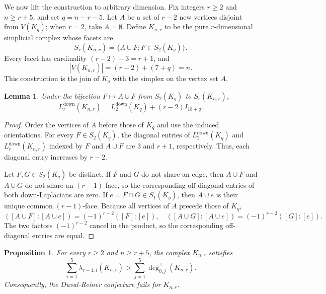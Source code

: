 \documentclass[12pt]{amsart}
\theoremstyle{plain}
\newtheorem{lem}[thm]{Lemma}
\newtheorem{prop}[thm]{Proposition}
\theoremstyle{definition}
\numberwithin{equation}{section}
\numberwithin{figure}{section}
\newcommand{\Ldown}{L^{\operatorname{down}}}
\begin{document}
We now lift the construction to arbitrary dimension.
Fix integers $r\geq 2$ and $n\geq r+5$, and set $q=n-r-5$.
Let $A$ be a set of $r-2$ new vertices disjoint from $V(K_q)$; when $r=2$, take $A=\emptyset$.
Define $K_{n,r}$ to be the pure $r$-dimensional simplicial complex whose facets are
\[
S_r(K_{n,r})
=
\{A\cup F:F\in S_2(K_q)\}.
\]
Every facet has cardinality $(r-2)+3=r+1$, and
\[
|V(K_{n,r})|=(r-2)+(7+q)=n.
\]
This construction is the join of $K_q$ with the simplex on the vertex set $A$.
\begin{lem}\label{complex-core}
Under the bijection $F\mapsto A\cup F$ from $S_2(K_q)$ to $S_r(K_{n,r})$,
\[
\Ldown_r(K_{n,r})
=
\Ldown_2(K_q)+(r-2)I_{18+q}.
\]
\end{lem}
\begin{proof}
Order the vertices of $A$ before those of $K_q$ and use the induced orientations.
For every $F\in S_2(K_q)$, the diagonal entries of $\Ldown_2(K_q)$ and $\Ldown_r(K_{n,r})$ indexed by $F$ and $A\cup F$ are $3$ and $r+1$, respectively.
Thus, each diagonal entry increases by $r-2$.

Let $F,G\in S_2(K_q)$ be distinct.
If $F$ and $G$ do not share an edge, then $A\cup F$ and $A\cup G$ do not share an $(r-1)$-face, so the corresponding off-diagonal entries of both down-Laplacians are zero.
If $e=F\cap G\in S_1(K_q)$, then $A\cup e$ is their unique common $(r-1)$-face.
Because all vertices of $A$ precede those of $K_q$,
\[
([A\cup F]:[A\cup e])=(-1)^{r-2}([F]:[e]),
\quad
([A\cup G]:[A\cup e])=(-1)^{r-2}([G]:[e]).
\]
The two factors $(-1)^{r-2}$ cancel in the product, so the corresponding off-diagonal entries are equal.
\end{proof}

\begin{prop}\label{general-counterexamples}
For every $r \geq 2$ and $n \geq r + 5$, the complex $K_{n,r}$ satisfies
\[
\sum_{i = 1}^5 \lambda_{r-1,i}(K_{n,r})
>
\sum_{j = 1}^5 \deg^\top_{0,j}(K_{n,r}).
\]
Consequently, the Duval-Reiner conjecture fails for $K_{n,r}$.
\end{prop}
\end{document}
